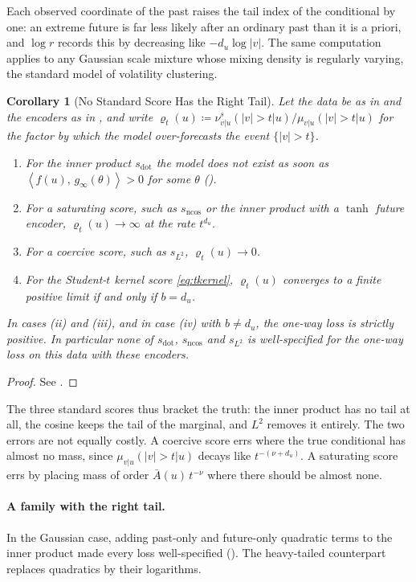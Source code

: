 \documentclass[11pt]{article}
\theoremstyle{plain}
\newtheorem{corollary}[theorem]{Corollary}
\theoremstyle{definition}
\theoremstyle{remark}
\newcommand{\define}{\coloneqq}
\newcommand{\IP}[2]{\left\langle #1,\, #2 \right\rangle}
\newcommand{\abs}[1]{\left\lvert #1 \right\rvert}
\newcommand{\sdot}{s_{\mathrm{dot}}}
\newcommand{\sncos}{s_{\mathrm{ncos}}}
\newcommand{\sltwo}{s_{L^2}}
\begin{document}
Each observed coordinate of the past raises the tail index of the conditional
by one: an extreme future is far less likely after an ordinary past than it is
a priori, and $\log r$ records this by decreasing like $-d_u\log\abs{v}$. The
same computation applies to any Gaussian scale mixture whose mixing density is
regularly varying, the standard model of volatility clustering.

\begin{corollary}[No Standard Score Has the Right Tail]
 \label{cor:trichotomy}
 Let the data be as in  and the encoders as in
 , and write
 $\varrho_t(u)\define\nu^{s}_{v\vert u}(\abs{v}>t\vert u)/\mu_{v\vert u}(\abs{v}>t\vert u)$
 for the factor by which the model over-forecasts the event $\{\abs{v}>t\}$.
 \begin{enumerate}[label=(\roman*)]
  \item For the inner product $\sdot$ the model does not exist as soon as
        $\IP{f(u)}{g_\infty(\theta)}>0$ for some $\theta$ ().
  \item For a saturating score, such as $\sncos$ or the inner product with a
        $\tanh$ future encoder, $\varrho_t(u)\to\infty$ at the rate $t^{d_u}$.
  \item For a coercive score, such as $\sltwo$, $\varrho_t(u)\to0$.
  \item For the Student-$t$ kernel score \eqref{eq:tkernel}, $\varrho_t(u)$
        converges to a finite positive limit if and only if $b=d_u$.
 \end{enumerate}
 In cases (ii) and (iii), and in case (iv) with $b\ne d_u$, the one-way loss
 is strictly positive. In particular none of $\sdot$, $\sncos$ and $\sltwo$
 is well-specified for the one-way loss on this data with these encoders.
\end{corollary}
\begin{proof}
 See .
\end{proof}

The three standard scores thus bracket the truth: the inner product has no
tail at all, the cosine keeps the tail of the marginal, and $L^2$ removes it
entirely. The two errors are not equally costly. A coercive score errs where
the true conditional has almost no mass, since
$\mu_{v\vert u}(\abs{v}>t\vert u)$ decays like $t^{-(\nu+d_u)}$. A saturating
score errs by placing mass of order $\bar A(u)\,t^{-\nu}$ where there should
be almost none.

\paragraph{A family with the right tail.}
In the Gaussian case, adding past-only and future-only quadratic terms to the
inner product made every loss well-specified (). The
heavy-tailed counterpart replaces quadratics by their logarithms.
\end{document}
